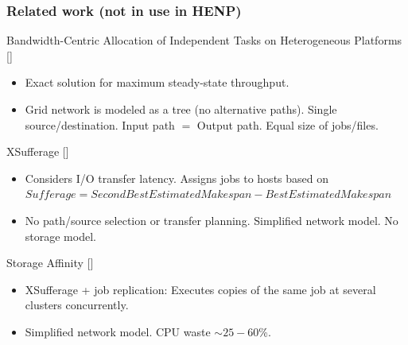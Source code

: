 \documentclass{beamer}
\begin{document}
\begin{frame}\frametitle{Related work (not in use in HENP)} 	
\begin{footnotesize}
\begin{block}{Bandwidth-Centric Allocation of Independent Tasks on Heterogeneous Platforms [\cite{Trees}]}  
		\begin{itemize}
			\item Exact solution for maximum steady-state throughput. 
			\item Grid network is modeled as a tree (no alternative paths). Single source/destination. Input path $=$ Output path. Equal size of jobs/files.		
		\end{itemize}
 	\end{block}

\begin{block}{XSufferage [\cite{casanova2000heuristics}]}	
	\begin{itemize}
 	 \item Considers I/O transfer latency. Assigns jobs to hosts based on $Sufferage = SecondBestEstimatedMakespan - BestEstimatedMakespan$
 	 \item No path/source selection or transfer planning. Simplified network model. No storage model.
 	 \end{itemize}
\end{block}  	 	
 	
\begin{block}{Storage Affinity [\cite{santos2005exploiting}]}	
	 \begin{itemize}
	 \item XSufferage + job replication: Executes copies of the same job at several clusters concurrently.
	 \item Simplified network model. CPU waste $\sim 25-60$\%.
 	  \end{itemize}
\end{block}

	 
\end{footnotesize}
\end{frame}
\end{document}
